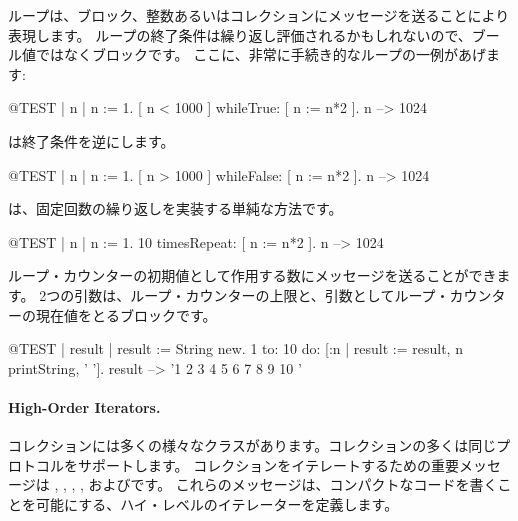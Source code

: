 \documentclass[a4paper,10pt,twoside]{book}
\begin{document}
ループは、ブロック、整数あるいはコレクションにメッセージを送ることにより表現します。
ループの終了条件は繰り返し評価されるかもしれないので、ブール値ではなくブロックです。
ここに、非常に手続き的なループの一例があげます:

\begin{code}{@TEST | n |}
n := 1.
[ n < 1000 ] whileTrue: [ n := n*2 ].
n --> 1024
\end{code}

\noindent
{}は終了条件を逆にします。
\begin{code}{@TEST | n |}
n := 1.
[ n > 1000 ] whileFalse: [ n := n*2 ].
n --> 1024
\end{code}

\noindent
{}は、固定回数の繰り返しを実装する単純な方法です。

\begin{code}{@TEST | n |}
n := 1.
10 timesRepeat: [ n := n*2 ].
n --> 1024
\end{code}

ループ・カウンターの初期値として作用する数にメッセージを送ることができます。
2つの引数は、ループ・カウンターの上限と、引数としてループ・カウンターの現在値をとるブロックです。

\begin{code}{@TEST | result |}
result := String new.
1 to: 10 do: [:n | result := result, n printString, ' '].
result --> '1 2 3 4 5 6 7 8 9 10 '
\end{code}


\paragraph{High-Order Iterators.}
コレクションには多くの様々なクラスがあります。コレクションの多くは同じプロトコルをサポートします。
コレクションをイテレートするための重要メッセージは
, , , , およびです。
これらのメッセージは、コンパクトなコードを書くことを可能にする、ハイ・レベルのイテレーターを定義します。
\end{document}
